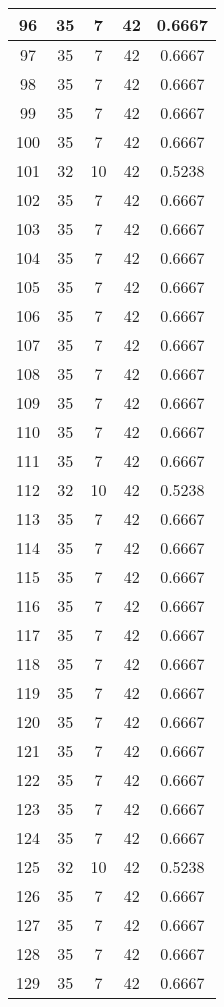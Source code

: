 \documentclass[letterpaper, 12pt]{article}
\begin{document}
\begin{longtable}{|c|c|c|c|c|}
\hline
96 & 35 & 7 & 42 & 0.6667 \\
\hline
97 & 35 & 7 & 42 & 0.6667 \\
\hline
98 & 35 & 7 & 42 & 0.6667 \\
\hline
99 & 35 & 7 & 42 & 0.6667 \\
\hline
100 & 35 & 7 & 42 & 0.6667 \\
\hline
101 & 32 & 10 & 42 & 0.5238 \\
\hline
102 & 35 & 7 & 42 & 0.6667 \\
\hline
103 & 35 & 7 & 42 & 0.6667 \\
\hline
104 & 35 & 7 & 42 & 0.6667 \\
\hline
105 & 35 & 7 & 42 & 0.6667 \\
\hline
106 & 35 & 7 & 42 & 0.6667 \\
\hline
107 & 35 & 7 & 42 & 0.6667 \\
\hline
108 & 35 & 7 & 42 & 0.6667 \\
\hline
109 & 35 & 7 & 42 & 0.6667 \\
\hline
110 & 35 & 7 & 42 & 0.6667 \\
\hline
111 & 35 & 7 & 42 & 0.6667 \\
\hline
112 & 32 & 10 & 42 & 0.5238 \\
\hline
113 & 35 & 7 & 42 & 0.6667 \\
\hline
114 & 35 & 7 & 42 & 0.6667 \\
\hline
115 & 35 & 7 & 42 & 0.6667 \\
\hline
116 & 35 & 7 & 42 & 0.6667 \\
\hline
117 & 35 & 7 & 42 & 0.6667 \\
\hline
118 & 35 & 7 & 42 & 0.6667 \\
\hline
119 & 35 & 7 & 42 & 0.6667 \\
\hline
120 & 35 & 7 & 42 & 0.6667 \\
\hline
121 & 35 & 7 & 42 & 0.6667 \\
\hline
122 & 35 & 7 & 42 & 0.6667 \\
\hline
123 & 35 & 7 & 42 & 0.6667 \\
\hline
124 & 35 & 7 & 42 & 0.6667 \\
\hline
125 & 32 & 10 & 42 & 0.5238 \\
\hline
126 & 35 & 7 & 42 & 0.6667 \\
\hline
127 & 35 & 7 & 42 & 0.6667 \\
\hline
128 & 35 & 7 & 42 & 0.6667 \\
\hline
129 & 35 & 7 & 42 & 0.6667 \\

\end{longtable}
\end{document}
